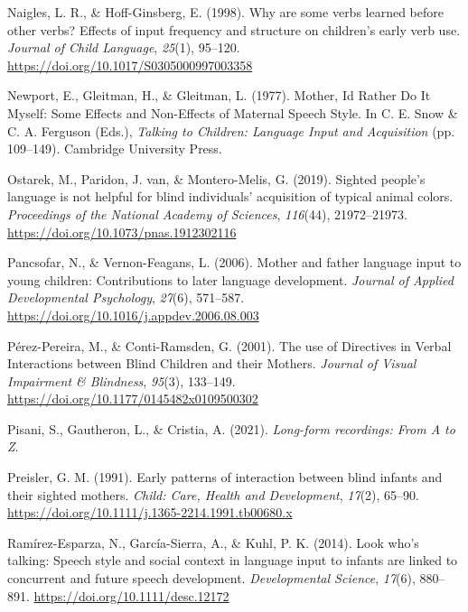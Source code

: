 \documentclass[
  man,floatsintext]{apa6}
\newlength{\cslhangindent}
\newlength{\cslentryspacingunit} %
\newenvironment{CSLReferences}[2] %
 {%
  \setlength{\parindent}{0pt}
  \ifodd #1
  \let\oldpar\par
  \def\par{\hangindent=\cslhangindent\oldpar}
  \fi
  \setlength{\parskip}{#2\cslentryspacingunit}
 }%
 {}
\begin{document}
\begin{CSLReferences}{1}{0}
\leavevmode{}%
Naigles, L. R., \& Hoff-Ginsberg, E. (1998). Why are some verbs learned before other verbs? {Effects} of input frequency and structure on children's early verb use. \emph{Journal of Child Language}, \emph{25}(1), 95--120. \url{https://doi.org/10.1017/S0305000997003358}

\leavevmode{}%
Newport, E., Gleitman, H., \& Gleitman, L. (1977). Mother, {Id Rather Do It Myself}: {Some Effects} and {Non-Effects} of {Maternal Speech Style}. In C. E. Snow \& C. A. Ferguson (Eds.), \emph{Talking to {Children}: {Language Input} and {Acquisition}} (pp. 109--149). Cambridge University Press.

\leavevmode{}%
Ostarek, M., Paridon, J. van, \& Montero-Melis, G. (2019). Sighted people's language is not helpful for blind individuals' acquisition of typical animal colors. \emph{Proceedings of the National Academy of Sciences}, \emph{116}(44), 21972--21973. \url{https://doi.org/10.1073/pnas.1912302116}

\leavevmode{}%
Pancsofar, N., \& Vernon-Feagans, L. (2006). Mother and father language input to young children: {Contributions} to later language development. \emph{Journal of Applied Developmental Psychology}, \emph{27}(6), 571--587. \url{https://doi.org/10.1016/j.appdev.2006.08.003}

\leavevmode{}%
Pérez-Pereira, M., \& Conti-Ramsden, G. (2001). The use of {Directives} in {Verbal Interactions} between {Blind Children} and their {Mothers}. \emph{Journal of Visual Impairment \& Blindness}, \emph{95}(3), 133--149. \url{https://doi.org/10.1177/0145482x0109500302}

\leavevmode{}%
Pisani, S., Gautheron, L., \& Cristia, A. (2021). \emph{Long-form recordings: {From A} to {Z}}.

\leavevmode{}%
Preisler, G. M. (1991). Early patterns of interaction between blind infants and their sighted mothers. \emph{Child: Care, Health and Development}, \emph{17}(2), 65--90. \url{https://doi.org/10.1111/j.1365-2214.1991.tb00680.x}

\leavevmode{}%
Ramírez-Esparza, N., García-Sierra, A., \& Kuhl, P. K. (2014). Look who's talking: Speech style and social context in language input to infants are linked to concurrent and future speech development. \emph{Developmental Science}, \emph{17}(6), 880--891. \url{https://doi.org/10.1111/desc.12172}


\end{CSLReferences}
\end{document}
